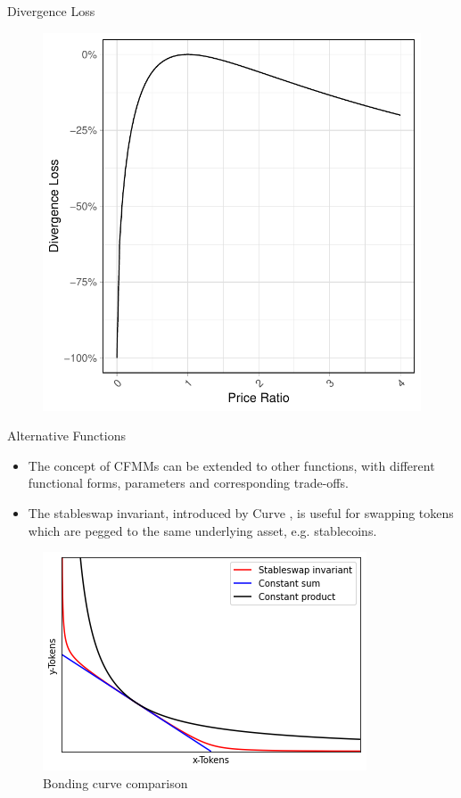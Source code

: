 \documentclass[]{beamer}
\begin{document}
\begin{frame}{Divergence Loss}
	\begin{figure}
		\includegraphics[scale=0.6]{../assets/images/divergence-loss.pdf}
	\end{figure}
\end{frame}


\begin{frame}{Alternative Functions}

\begin{small}
\begin{itemize}
	\item The concept of CFMMs can be extended to other functions, with different functional forms, parameters and corresponding trade-offs. 
	\item The stableswap invariant, introduced by Curve \cite{CRV}, is useful for swapping tokens which are pegged to the same underlying asset, e.g. stablecoins.
	\end{itemize}
\end{small}

	\begin{figure}
		\includegraphics[scale=0.5]{../assets/images/bonding-curves.png}
		\caption*{Bonding curve comparison \cite{CRV}}
	\end{figure}
	
\end{frame}
\end{document}
